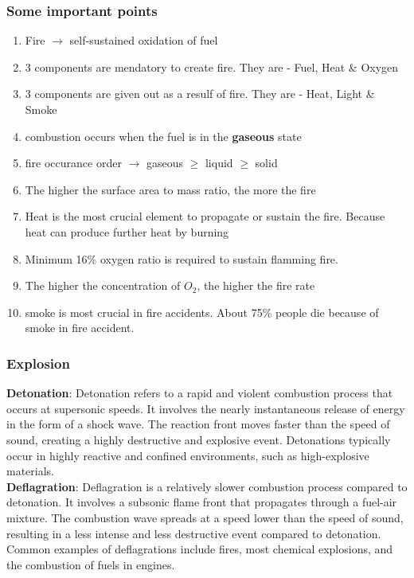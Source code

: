 \documentclass{article}
\begin{document}
\subsubsection*{Some important points}
\begin{enumerate}
  \item Fire $\rightarrow$ self-sustained oxidation of fuel 
  \item 3 components are mendatory to create fire. They are - Fuel, Heat \& Oxygen 
  \item 3 components are given out as a resulf of fire. They are -  Heat, Light \& Smoke 
  \item combustion occurs when the fuel is in the \textbf{gaseous} state 
  \item fire occurance order $\rightarrow$ gaseous $\geqslant$  liquid $\geqslant$  solid
  \item The higher the surface area to mass ratio, the more the fire 
  \item Heat is the most crucial element to propagate or sustain the fire. Because heat can produce further heat by burning
  \item Minimum 16\% oxygen ratio is required to sustain flamming fire.
  \item The higher the concentration of $O_2$, the higher the fire rate 
  \item smoke is most crucial in fire accidents. About 75\% people die because of smoke in fire accident. 
\end{enumerate}

\subsubsection*{Explosion}
\textbf{Detonation}: Detonation refers to a rapid and violent combustion process that occurs at supersonic speeds. It involves the nearly instantaneous release of energy in the form of a shock wave. The reaction front moves faster than the speed of sound, creating a highly destructive and explosive event. Detonations typically occur in highly reactive and confined environments, such as high-explosive materials.
\\

\textbf{Deflagration}: Deflagration is a relatively slower combustion process compared to detonation. It involves a subsonic flame front that propagates through a fuel-air mixture. The combustion wave spreads at a speed lower than the speed of sound, resulting in a less intense and less destructive event compared to detonation. Common examples of deflagrations include fires, most chemical explosions, and the combustion of fuels in engines.\\
\end{document}
